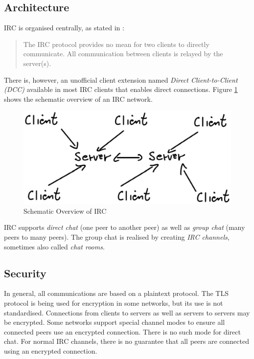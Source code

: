 \subsection{Architecture}
IRC is organised centrally, as stated in \cite{rfc2810}:
\begin{quote}
The IRC protocol provides no mean for two clients to directly
communicate.  All communication between clients is relayed by the
server(s).
\end{quote}
There is, however, an unofficial client extension named 
\textit{Direct Client-to-Client (DCC)}\cite{dcc,ctcp}
available in most IRC clients that enables direct connections.
Figure \ref{ircoverview} shows the schematic overview of an IRC network.
\begin{figure}
    \caption{Schematic Overview of IRC}
    \label{ircoverview}
    \centering
    
    \includegraphics{irc.eps}
\end{figure}
IRC supports 
\textit{direct chat} (one peer to another peer) as well 
as \textit{group chat} (many peers to many peers). The group chat is
realised by creating \textit{IRC channels}, sometimes also called 
\textit{chat rooms}.
\subsection{Security}
In general, all communications are based on a plaintext protocol.
The TLS protocol \cite{rfc2246} is being used for encryption
in some networks, but its use is not standardised. 
Connections from clients to servers
as well as servers to servers may be encrypted.
Some networks support special channel modes to ensure all connected peers
use an encrypted connection. There is no such mode for
direct chat. For normal IRC channels, there is no guarantee that all
peers are connected using an encrypted connection.


